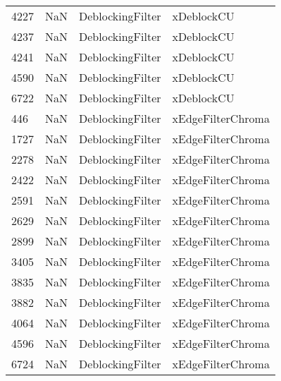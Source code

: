 \begin{tabular}{llll}
4227 &                   NaN &           DeblockingFilter &                                xDeblockCU \\
4237 &                   NaN &           DeblockingFilter &                                xDeblockCU \\
4241 &                   NaN &           DeblockingFilter &                                xDeblockCU \\
4590 &                   NaN &           DeblockingFilter &                                xDeblockCU \\
6722 &                   NaN &           DeblockingFilter &                                xDeblockCU \\
446  &                   NaN &           DeblockingFilter &                         xEdgeFilterChroma \\
1727 &                   NaN &           DeblockingFilter &                         xEdgeFilterChroma \\
2278 &                   NaN &           DeblockingFilter &                         xEdgeFilterChroma \\
2422 &                   NaN &           DeblockingFilter &                         xEdgeFilterChroma \\
2591 &                   NaN &           DeblockingFilter &                         xEdgeFilterChroma \\
2629 &                   NaN &           DeblockingFilter &                         xEdgeFilterChroma \\
2899 &                   NaN &           DeblockingFilter &                         xEdgeFilterChroma \\
3405 &                   NaN &           DeblockingFilter &                         xEdgeFilterChroma \\
3835 &                   NaN &           DeblockingFilter &                         xEdgeFilterChroma \\
3882 &                   NaN &           DeblockingFilter &                         xEdgeFilterChroma \\
4064 &                   NaN &           DeblockingFilter &                         xEdgeFilterChroma \\
4596 &                   NaN &           DeblockingFilter &                         xEdgeFilterChroma \\
6724 &                   NaN &           DeblockingFilter &                         xEdgeFilterChroma \\

\end{tabular}
